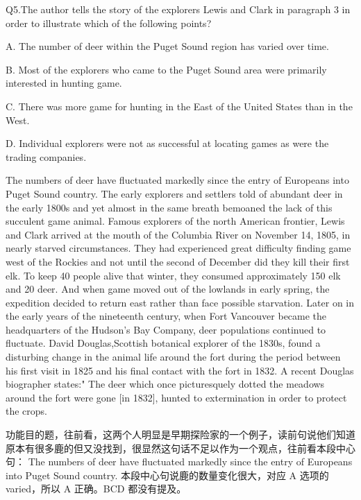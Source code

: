 \begin{blk}
    \begin{qst}
        Q5.The author tells the story of the explorers Lewis and Clark in paragraph 3 in order to illustrate which of the following points?
    \end{qst}

    \begin{chc}
        A. The number of deer within the Puget Sound region has varied over time.

        B. Most of the explorers who came to the Puget Sound area were primarily interested in hunting game.

        C. There was more game for hunting in the East of the United States than in the West.

        D. Individual explorers were not as successful at locating games as were the trading companies.
    \end{chc}

    \begin{psgq}
        The numbers of deer have fluctuated markedly since the entry of Europeans into Puget Sound country. The early explorers and settlers told of abundant deer in the early 1800s and yet almost in the same breath bemoaned the lack of this succulent game animal. Famous explorers of the north American frontier, Lewis and Clark arrived at the mouth of the Columbia River on November 14, 1805, in nearly starved circumstances. They had experienced great difficulty finding game west of the Rockies and not until the second of December did they kill their first elk. To keep 40 people alive that winter, they consumed approximately 150 elk and 20 deer. And when game moved out of the lowlands in early spring, the expedition decided to return east rather than face possible starvation. Later on in the early years of the nineteenth century, when Fort Vancouver became the headquarters of the Hudson's Bay Company, deer populations continued to fluctuate. David Douglas,Scottish botanical explorer of the 1830s, found a disturbing change in the animal life around the fort during the period between his first visit in 1825 and his final contact with the fort in 1832. A recent Douglas biographer states:" The deer which once picturesquely dotted the meadows around the fort were gone [in 1832], hunted to extermination in order to protect the crops.
    \end{psgq}

    \begin{nlz}
        功能目的题，往前看，这两个人明显是早期探险家的一个例子，读前句说他们知道原本有很多鹿的但又没找到，很显然这句话不足以作为一个观点，往前看本段中心句：
        The numbers of deer have fluctuated markedly since the entry of Europeans into Puget Sound country.
        本段中心句说鹿的数量变化很大，对应 A 选项的 varied，所以 A 正确。BCD 都没有提及。
    \end{nlz}
\end{blk}


